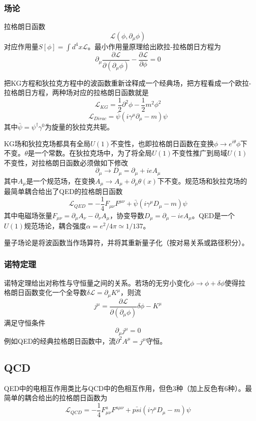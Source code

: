 \documentclass[a4paper,11pt]{ctexart}
\newcommand{\beq}{\begin{equation}}
\newcommand{\eeq}{\end{equation}}
\newcommand{\lag}{\mathcal{L}}
\begin{document}
\subsubsection{场论}
拉格朗日函数
\beq
\lag(\phi, \partial_\mu \phi)
\eeq
对应作用量$S[\phi] = \int d^4 x \lag$。最小作用量原理给出欧拉-拉格朗日方程为
\beq
\partial_\mu \frac{\partial \lag}{\partial \left( \partial_\mu \phi \right)} - \frac{\partial \lag}{\partial \phi} = 0
\eeq
\par
把KG方程和狄拉克方程中的波函数重新诠释成一个经典场，把方程看成一个欧拉-拉格朗日方程，两种场对应的拉格朗日函数就是
\beq
\lag_{KG} = \frac{1}{2} \partial^2 \phi - \frac{1}{2} m^2 \phi^2
\eeq
\beq
\lag_{Dirac} = \bar{\psi} \left(i \gamma^\mu \partial_\mu - m\right)\psi
\eeq
其中$\bar{\psi} = \psi^\dagger \gamma^0$为旋量的狄拉克共轭。
\par
KG场和狄拉克场都具有全局$U(1)$不变性，也即拉格朗日函数在变换$\phi \to e^{i \theta} \phi$下不变。$\theta$是一个常数。在狄拉克场中，为了将全局$U(1)$不变性推广到局域$U(1)$不变性，对拉格朗日函数必须做如下修改
\beq
\partial_\mu \to D_\mu = \partial_\mu + ieA_\mu
\eeq
其中$A_\mu$是一个规范场，在变换$A_\mu \to A_\mu + \partial_\mu \theta(x)$下不变。规范场和狄拉克场的最简单耦合给出了QED的拉格朗日函数
\beq
\lag_{QED} = -\frac{1}{4}F_{\mu \nu}F^{\mu \nu} + \bar{\psi}\left(i \gamma^\mu D_\mu - m\right) \psi
\eeq
其中电磁场张量$F_{\mu \nu} = \partial_\mu A_\nu - \partial_\nu A_\mu$，协变导数$D_\mu = \partial_\mu -ie A_\mu$。QED是一个$U(1)$规范场论，耦合强度$\alpha = e^2/4\pi \simeq 1/137$。
\par
量子场论是将波函数当作场算符，并将其重新量子化（按对易关系或路径积分）。
\subsubsection{诺特定理}
诺特定理给出对称性与守恒量之间的关系。若场的无穷小变化$\phi \to \phi + \delta \phi$使得拉格朗日函数变化一个全导数$\delta \lag = \partial_\mu K^\mu$，则流
\beq
j^\mu = \frac{\partial \lag}{\partial \left(\partial_\mu \phi \right)}\delta \phi - K^\mu
\eeq
满足守恒条件
\beq
\partial_\mu j^\mu = 0
\eeq
例如QED的经典拉格朗日函数中，流$\partial^2 A^\mu = j^\mu$守恒。
\subsection{QCD}
QED中的电相互作用类比与QCD中的色相互作用，但色3种（加上反色有6种）。最简单的耦合给出的拉格朗日函数为
\beq
\lag_{QCD} = -\frac{1}{4} F^a_{\mu \nu} F^{a\mu \nu} + \bar{psi} \left(i \gamma^\mu D_\mu - m \right)\psi
\eeq
\end{document}
